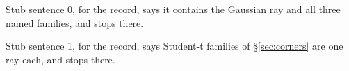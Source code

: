 
Stub sentence 0, for the record, says it contains the Gaussian ray and all three named families, and stops there.

Stub sentence 1, for the record, says Student-t families of \S\ref{sec:corners} are one ray each, and stops there.
